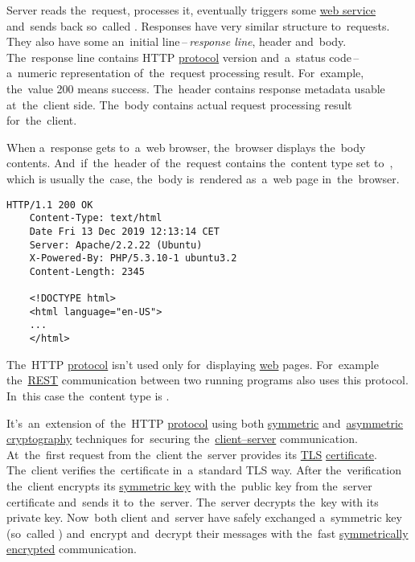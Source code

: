 Server reads the~request, processes it, eventually triggers some \hyperref[webserviceapplication]{web service} and~sends back so~called .
Responses have very similar structure to~requests.
They also have some an~initial line\,--\,\textit{response line}, header and~body.
The~response line contains HTTP \hyperref[protocolstandard]{protocol} version and~a~status code\,--\, a~numeric representation of~the~request processing result.
For~example, the~value 200 means success.
The~header contains response metadata usable at~the~client side.
The~body contains actual request processing result for~the~client.

When a~response gets to~a~web browser, the~browser displays the~body contents.
And~if~the~header of~the~request contains the~content type set to~, which is usually the~case, the~body is~rendered as~a~web page in~the~browser.

\begin{lstlisting}[title={Example of a~HTTP response}]
    HTTP/1.1 200 OK
    Content-Type: text/html
    Date Fri 13 Dec 2019 12:13:14 CET
    Server: Apache/2.2.22 (Ubuntu)
    X-Powered-By: PHP/5.3.10-1 ubuntu3.2
    Content-Length: 2345

    <!DOCTYPE html>
    <html language="en-US">
    ...
    </html>
\end{lstlisting}

\notenonl The~HTTP \hyperref[protocolstandard]{protocol} isn't used only for~displaying \hyperref[internetweb]{web} pages.
For~example the~\hyperref[rest]{REST} communication between two running programs also uses this protocol.
In~this case the~content type is .

\label{https}
It's~an~extension of~the~HTTP \hyperref[protocolstandard]{protocol} using both \hyperref[symmetriccryptography]{symmetric} and~\hyperref[asymmetriccryptography]{asymmetric} \hyperref[cryptography]{cryptography} techniques for~securing the~\hyperref[clientserverarchitecture]{client--server} communication.
At~the~first request from the~client the~server provides its \hyperref[tls]{TLS} \hyperref[certificate]{certificate}.
The~client verifies the~certificate in~a~standard TLS way.
After the~verification the~client encrypts its \hyperref[symmetriccryptography]{symmetric key} with the~public key from the~server certificate and~sends it to~the~server.
The~server decrypts the~key with its private key.
Now~both client and~server have safely exchanged a~symmetric key (so~called ) and~encrypt and~decrypt their messages with the~fast \hyperref[symmetriccryptography]{symmetrically encrypted} communication.

